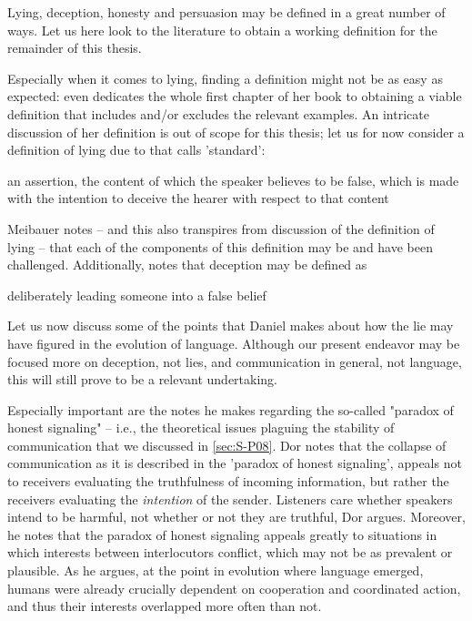 Lying, deception, honesty and persuasion may be defined in a great number of ways. Let us here look to the literature to obtain a working definition for the remainder of this thesis.

Especially when it comes to lying, finding a definition might not be as easy as expected: \citet{Saul12} even dedicates the whole first chapter of her book to obtaining a viable definition that includes and/or excludes the relevant examples. An intricate discussion of her definition is out of scope for this thesis; let us for now consider a definition of lying due to \citet{Williams02} that \citet{Meibauer18} calls 'standard':
\begin{quoting}
    an assertion, the content of which the speaker believes to be false, which is made with the intention to deceive the hearer with respect to that content
    \hfill \citep[p.~96]{Williams02}
\end{quoting}
Meibauer notes -- and this also transpires from  discussion of the definition of lying -- that each of the components of this definition may be and have been challenged.
Additionally, \citet{Meibauer18} notes that deception may be defined as
\begin{quoting}
    deliberately leading someone into a false belief
    \hfill \citep[.~358]{Meibauer18}
\end{quoting}

Let us now discuss some of the points that Daniel \citet{Dor17} makes about how the lie may have figured in the evolution of language. Although our present endeavor may be focused more on deception, not lies, and communication in general, not language, this will still prove to be a relevant undertaking.

Especially important are the notes he makes regarding the so-called "paradox of honest signaling" \citep[p.~45]{Dor17} -- i.e., the theoretical issues plaguing the stability of communication that we discussed in \cref{sec:S-P08}. Dor notes that the collapse of communication as it is described in the 'paradox of honest signaling', appeals not to receivers evaluating the truthfulness of incoming information, but rather the receivers evaluating the \emph{intention} of the sender. Listeners care whether speakers intend to be harmful, not whether or not they are truthful, Dor argues.
Moreover, he notes that the paradox of honest signaling appeals greatly to situations in which interests between interlocutors conflict, which may not be as prevalent or plausible. As he argues, at the point in evolution where language emerged, humans were already crucially dependent on cooperation and coordinated action, and thus their interests overlapped more often than not.

